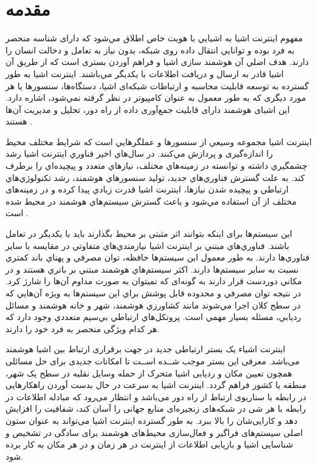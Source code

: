 \chapter{مقدمه}
مفهوم اينترنت اشيا  به اشيايي با هويت خاص اطلاق مي‌شود كه دارای شناسه منحصر به فرد بوده و توانايي انتقال داده روی شبکه، بدون نياز به تعامل و دخالت انسان را دارند. هدف اصلي آن هوشمند سازی اشيا و فراهم آوردن بستری است كه از طريق آن اشيا قادر به ارسال و دريافت اطلاعات با يکديگر مي‌باشند. اينترنت اشيا به طور گسترده به توسعه قابليت محاسبه و ارتباطات شبکه‌ای اشيا، دستگاه‌ها، سنسورها يا هر مورد ديگری كه به طور معمول به عنوان كامپيوتر در نظر گرفته نمي‌شود، اشاره دارد. اين اشيای هوشمند دارای قابليت جمع‌آوری داده از راه دور، تحليل و مديريت آن‌ها هستند \cite{Mukhtar2015}.


اینترنت اشیا مجموعه وسيعي از سنسورها و عملگرهايي است كه شرايط مختلف محیط را اندازه‌گیری و پردازش مي‌كنند. در سال‌هاي اخير فناوري اينترنت اشيا رشد چشمگيري داشته و توانسته در زمينه‌هاي مختلف، نيازهاي متعدد و پيچيده‌اي را برطرف كند. به علت گسترش فناوري‌هاي جديد، توليد سنسورهاي هوشمند، رشد تكنولوژي‌هاي ارتباطي و پيچيده شدن نيازها، اينترنت اشيا قدرت زيادي پيدا كرده و در زمینه‌های مختلف از آن استفاده مي‌شود و باعث گسترش سيستم‌هاي هوشمند در محیط شده است \cite{Shah2016}.


 این سیستم‌ها برای اینکه بتوانند اثر مثبتی بر محیط بگذارند باید با یکدیگر در تعامل باشند. فناوري‌هاي مبتني بر اينترنت اشيا نيازمندي‌هاي متفاوتي در مقايسه با ساير فناوري‌ها دارند. به طور معمول اين سيستم‌ها حافظه، توان مصرفي و پهناي باند كمتري نسبت به ساير سيستم‌ها دارند. اكثر سيستم‌هاي هوشمند مبتني بر باتري هستند و در مكاني دوردست قرار دارند به گونه‌ای كه نمیتوان به صورت مداوم آن‌ها را شارژ كرد. در نتيجه توان مصرفي و محدوده قابل پوشش براي اين سيستم‌ها به ويژه آن‌هايي كه در سطح كلان اجرا مي‌شوند مانند كشاورزي هوشمند، شهر و خانه هوشمند و مسائل رديابي، مسئله بسيار مهمي است. پروتكل‌هاي ارتباطي بي‌سيم متعددي وجود دارد كه هر كدام ويژگی منحصر به فرد خود را دارند.


اینترنت اشیاء یک بستر ارتباطی جدید در جهت برقراری ارتباط بین اشیا هوشمند می‌باشد. معرفی این بستر موجب شــده اســت تا امکانات جدیدی برای حل مسائلی همچون تعیین مکان و ردیابی اشیا متحرک از حمله وسایل نقلیه در سطح یک شهر، منطقه یا کشور فراهم گردد. اینترنت اشیا به سرعت در حال بدست آوردن راهکارهایی در رابطه با سناریوی ارتباط از راه دور می‌باشد و انتظار می‌رود که مبادله اطلاعات در رابطه با هر شی در شبکه‌های زنجیره‌ای منابع جهانی را آسان کند، شفافیت را افزایش دهد و کارایی‌شان را بالا ببرد.
\newpage
به طور گسترده اینترنت اشیا می‌تواند به عنوان ستون اصلی سیستم‌های فراگیر و فعال‌سازی محیط‌های هوشمند برای سادگی در تشخیص و شناسایی اشیا و بازیابی اطلاعات از اینترنت در هر زمان و در هر مکان به کار برده شود.


